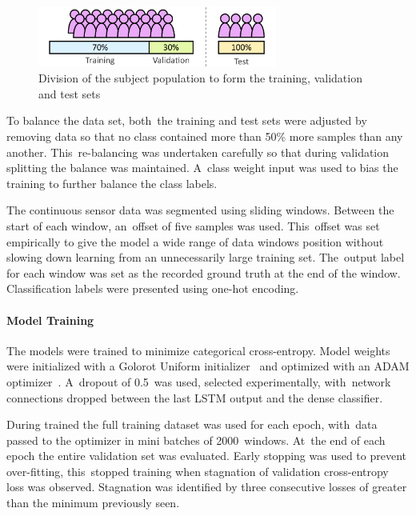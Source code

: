 \begin{figure}[!hbt]
    \centering
    \includegraphics[width=0.7\textwidth]{content/4-LSTM_Behaviour/test_train_split.pdf}
    \caption[Division of the population to form the training, validation and test sets]{Division of the subject population to form the training, validation and test sets}
    \label{fig:test_training_split}
\end{figure}

To balance the data set, both~the training and test sets were adjusted by removing data so that no class contained more than 50\% more samples than any another. This~re-balancing was undertaken carefully so that during validation splitting the balance was maintained. A~class weight input was used to bias the training to further balance the class labels.

The continuous sensor data was segmented using sliding windows. Between the start of each window, an~offset of five samples was used. This~offset was set empirically to give the model a wide range of data windows position without slowing down learning from an unnecessarily large training set. The~output label for each window was set as the recorded ground truth at the end of the window. Classification labels were presented using one-hot encoding.

\paragraph{Model Training}
The models were trained to minimize categorical cross-entropy. Model weights were initialized with a Golorot Uniform initializer~\cite{Glorot2010} and optimized with an ADAM optimizer~\cite{Kingma2015}. A~dropout of 0.5~was used, selected experimentally, with~network connections dropped between the last LSTM output and the dense classifier.

During trained the full training dataset was used for each epoch, with~data passed to the optimizer in mini batches of 2000~windows. At~the end of each epoch the entire validation set was evaluated. Early stopping was used to prevent over-fitting, this~stopped training when stagnation of validation cross-entropy loss was observed. Stagnation was identified by three consecutive losses of greater than the minimum previously seen.

